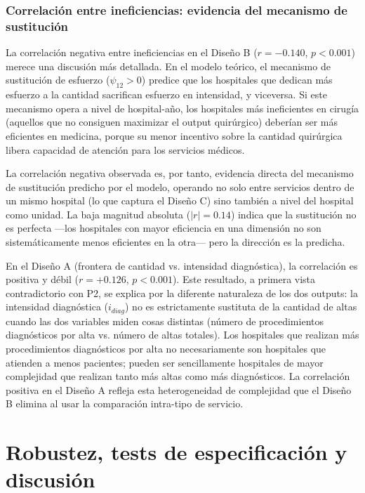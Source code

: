 \documentclass[12pt, a4paper, twoside, openright]{book}
\theoremstyle{plain}
\theoremstyle{definition}
\theoremstyle{remark}
\begin{document}
\subsection{Correlación entre ineficiencias: evidencia del mecanismo de sustitución}

La correlación negativa entre ineficiencias en el Diseño B ($r=-0.140$, $p<0.001$) merece una discusión más detallada. En el modelo teórico, el mecanismo de sustitución de esfuerzo ($\psi_{12}>0$) predice que los hospitales que dedican más esfuerzo a la cantidad sacrifican esfuerzo en intensidad, y viceversa. Si este mecanismo opera a nivel de hospital-año, los hospitales más ineficientes en cirugía (aquellos que no consiguen maximizar el output quirúrgico) deberían ser más eficientes en medicina, porque su menor incentivo sobre la cantidad quirúrgica libera capacidad de atención para los servicios médicos.

La correlación negativa observada es, por tanto, evidencia directa del mecanismo de sustitución predicho por el modelo, operando no solo entre servicios dentro de un mismo hospital (lo que captura el Diseño C) sino también a nivel del hospital como unidad. La baja magnitud absoluta ($|r|=0.14$) indica que la sustitución no es perfecta ---los hospitales con mayor eficiencia en una dimensión no son sistemáticamente menos eficientes en la otra--- pero la dirección es la predicha.

En el Diseño A (frontera de cantidad vs. intensidad diagnóstica), la correlación es positiva y débil ($r=+0.126$, $p<0.001$). Este resultado, a primera vista contradictorio con P2, se explica por la diferente naturaleza de los dos outputs: la intensidad diagnóstica ($i_{diag}$) no es estrictamente sustituta de la cantidad de altas cuando las dos variables miden cosas distintas (número de procedimientos diagnósticos por alta vs. número de altas totales). Los hospitales que realizan más procedimientos diagnósticos por alta no necesariamente son hospitales que atienden a menos pacientes; pueden ser sencillamente hospitales de mayor complejidad que realizan tanto más altas como más diagnósticos. La correlación positiva en el Diseño A refleja esta heterogeneidad de complejidad que el Diseño B elimina al usar la comparación intra-tipo de servicio.


\chapter{Robustez, tests de especificación y discusión}
\label{ch:robustez}
\end{document}
